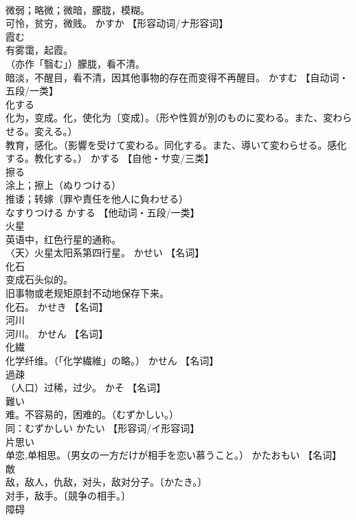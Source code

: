 \documentclass[8pt]{extreport}
\begin{document}
\begin{CJK}{UTF8}{min}
\\	微弱；略微；微暗，朦胧，模糊。 
\\	可怜，贫穷，微贱。	かすか		【形容动词/ナ形容词】
\\	霞む	
\\	有雾霭，起霞。 
\\	（亦作「翳む」）朦胧，看不清。 
\\	暗淡，不醒目，看不清，因其他事物的存在而变得不再醒目。	かすむ		【自动词・五段/一类】
\\	化する	
\\	化为，变成。化，使化为〔变成〕。（形や性質が別のものに変わる。また、変わらせる。変える。） 
\\	教育，感化。（影響を受けて変わる。同化する。また、導いて変わらせる。感化する。教化する。）	かする		【自他・サ变/三类】
\\	擦る	
\\	涂上；擦上（ぬりつける） 
\\	推诿；转嫁（罪や責任を他人に負わせる） 
\\	なすりつける	かする		【他动词・五段/一类】
\\	火星	
\\	英语中，红色行星的通称。 
\\	〈天〉火星太阳系第四行星。	かせい		【名词】
\\	化石	
\\	变成石头似的。 
\\	旧事物或老规矩原封不动地保存下来。 
\\	化石。	かせき		【名词】
\\	河川	
\\	河川。	かせん		【名词】
\\	化繊	
\\	化学纤维。（「化学繊維」の略。）	かせん		【名词】
\\	過疎	
\\	（人口）过稀，过少。	かそ		【名词】
\\	難い	
\\	难。不容易的，困难的。（むずかしい。） 
\\	同：むずかしい	かたい		【形容词/イ形容词】
\\	片思い	
\\	单恋,单相思。（男女の一方だけが相手を恋い慕うこと｡）	かたおもい		【名词】
\\	敵	
\\	敌，敌人，仇敌，对头，敌对分子。〔かたき。〕 
\\	对手，敌手。〔競争の相手。〕 
\\	障碍

\end{CJK}
\end{document}
